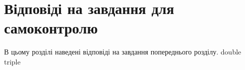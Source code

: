 \chapter{Відповіді на завдання для самоконтролю}
В цьому розділі наведені відповіді на завдання попереднього розділу.
{double}
{triple}
